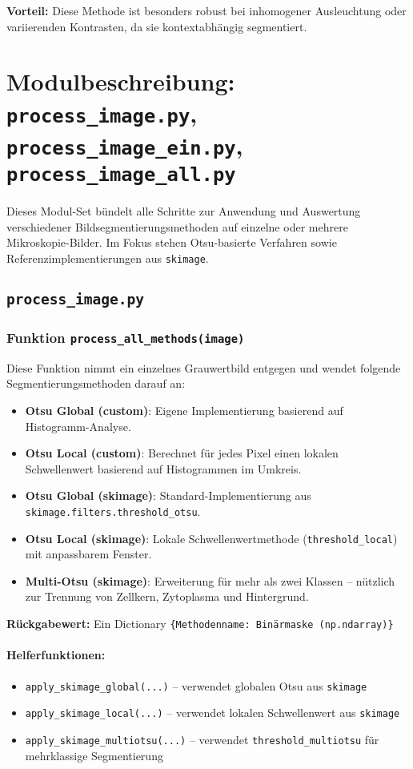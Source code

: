 \documentclass[a4paper,12pt]{article}
\begin{document}
\textbf{Vorteil:} Diese Methode ist besonders robust bei inhomogener Ausleuchtung oder variierenden Kontrasten, da sie kontextabhängig segmentiert.


\section*{ Modulbeschreibung: \texttt{process\_image.py}, 
\texttt{process\_image\_ein.py}, \texttt{process\_image\_all.py}}

Dieses Modul-Set bündelt alle Schritte zur Anwendung und Auswertung verschiedener Bildsegmentierungsmethoden auf einzelne oder mehrere Mikroskopie-Bilder. Im Fokus stehen Otsu-basierte Verfahren sowie Referenzimplementierungen aus \texttt{skimage}.

\subsection*{ \texttt{process\_image.py}}

\subsubsection*{Funktion \texttt{process\_all\_methods(image)}}

Diese Funktion nimmt ein einzelnes Grauwertbild entgegen und wendet folgende Segmentierungsmethoden darauf an:

\begin{itemize}
  \item \textbf{Otsu Global (custom)}: Eigene Implementierung basierend auf Histogramm-Analyse.
  \item \textbf{Otsu Local (custom)}: Berechnet für jedes Pixel einen lokalen Schwellenwert basierend auf Histogrammen im Umkreis.
  \item \textbf{Otsu Global (skimage)}: Standard-Implementierung aus \texttt{skimage.filters.threshold\_otsu}.
  \item \textbf{Otsu Local (skimage)}: Lokale Schwellenwertmethode (\texttt{threshold\_local}) mit anpassbarem Fenster.
  \item \textbf{Multi-Otsu (skimage)}: Erweiterung für mehr als zwei Klassen – nützlich zur Trennung von Zellkern, Zytoplasma und Hintergrund.
\end{itemize}

\textbf{Rückgabewert:} Ein Dictionary \texttt{\{Methodenname: Binärmaske (np.ndarray)\}}

\paragraph{Helferfunktionen:}
\begin{itemize}
  \item \texttt{apply\_skimage\_global(...)} – verwendet globalen Otsu aus \texttt{skimage}
  \item \texttt{apply\_skimage\_local(...)} – verwendet lokalen Schwellenwert aus \texttt{skimage}
  \item \texttt{apply\_skimage\_multiotsu(...)} – verwendet \texttt{threshold\_multiotsu} für mehrklassige Segmentierung
\end{itemize}
\end{document}
